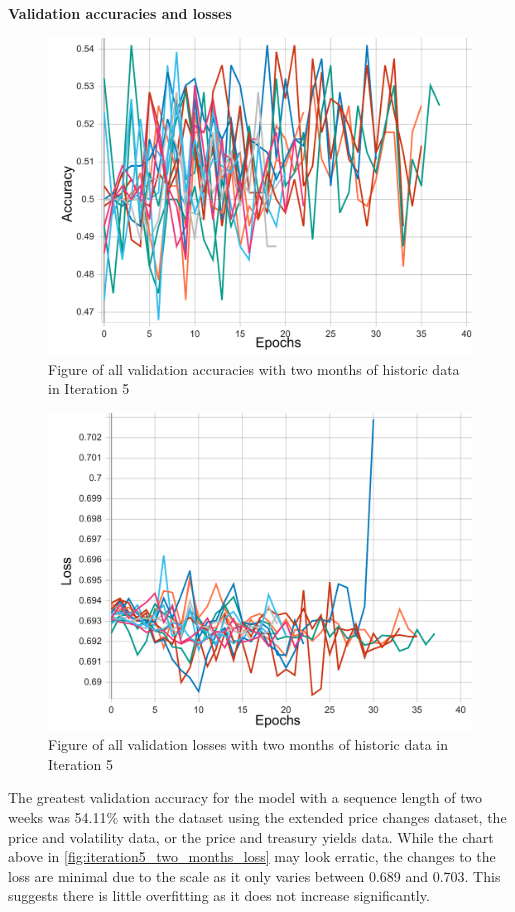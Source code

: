 \pagebreak
\textbf{Validation accuracies and losses}
\begin{figure}[ht]
    \centering
    \includegraphics[width=0.575\columnwidth]{figures/results/final/two_months_acc.pdf}
    \caption[Validation accuracies for Iteration 5 with two months of historic data]{Figure of all validation accuracies with two months of historic data in Iteration 5}
    \label{fig:iteration5_two_months_accuracy}
\end{figure}
\FloatBarrier

\begin{figure}[ht]
    \centering
    \includegraphics[width=0.575\columnwidth]{figures/results/final/two_months_loss.pdf}
    \caption[Validation losses for Iteration 5 with two months of historic data]{Figure of all validation losses with two months of historic data in Iteration 5}
    \label{fig:iteration5_two_months_loss}
\end{figure}
\FloatBarrier

The greatest validation accuracy for the model with a sequence length of two weeks was 54.11\% with the dataset using the extended price
changes dataset, the price and volatility data, or the price and treasury yields data.
While the chart above in \autoref{fig:iteration5_two_months_loss} may look erratic, the changes to the loss are minimal due to the scale as it only varies
between 0.689 and 0.703. This suggests there is little overfitting as it does not increase significantly.

